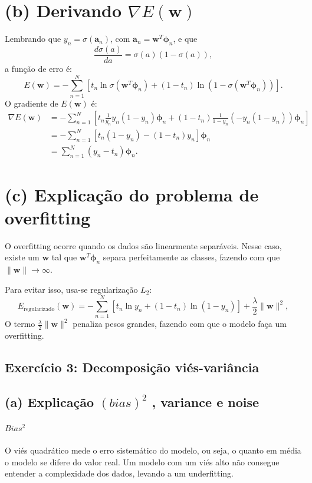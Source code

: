 \documentclass[conference]{IEEEtran}
\begin{document}
\section*{(b) Derivando $\nabla E(\mathbf{w})$}
Lembrando que $y_n = \sigma(\mathbf{a}_n)$, com $\mathbf{a}_n = \mathbf{w}^T \boldsymbol{\phi}_n$, e que
\[
\frac{d\sigma(a)}{da} = \sigma(a)(1 - \sigma(a)),
\]
a função de erro é:
\[
E(\mathbf{w}) = -\sum_{n=1}^{N} \left[ t_n \ln \sigma(\mathbf{w}^T \boldsymbol{\phi}_n) + (1 - t_n) \ln(1 - \sigma(\mathbf{w}^T \boldsymbol{\phi}_n)) \right].
\]
O gradiente de $E(\mathbf{w})$ é:
\begin{align*}
\nabla E(\mathbf{w}) &= -\sum_{n=1}^{N} \left[ t_n \frac{1}{y_n} y_n (1 - y_n) \boldsymbol{\phi}_n + (1 - t_n) \frac{1}{1 - y_n} (-y_n (1 - y_n)) \boldsymbol{\phi}_n \right] \\
&= -\sum_{n=1}^{N} \left[ t_n (1 - y_n) - (1 - t_n) y_n \right] \boldsymbol{\phi}_n \\
&= \sum_{n=1}^{N} (y_n - t_n) \boldsymbol{\phi}_n.
\end{align*}

\section*{(c) Explicação do problema de overfitting}
O overfitting ocorre quando os dados são linearmente separáveis. Nesse caso, existe um $\mathbf{w}$ tal que $\mathbf{w}^T \boldsymbol{\phi}_n$ separa perfeitamente as classes, fazendo com que $\|\mathbf{w}\| \to \infty$.

Para evitar isso, usa-se regularização $L_2$:
\[
E_{\text{regularizado}}(\mathbf{w}) = -\sum_{n=1}^{N} \left[ t_n \ln y_n + (1 - t_n) \ln(1 - y_n) \right] + \frac{\lambda}{2} \|\mathbf{w}\|^2,
\]
O termo $\frac{\lambda}{2} \|\mathbf{w}\|^2$ penaliza pesos grandes, fazendo com que o modelo faça um overfitting.

\subsection{Exercício 3: Decomposição viés-variância}
\label{subsec:ex3}
\subsection*{(a) Explicação $(bias) ^ 2$ , variance e noise}
\paragraph{$Bias ^ 2$}
O viés quadrático mede o erro sistemático do modelo, ou seja, o quanto em média o modelo se difere do valor real. Um modelo com um viés alto não consegue entender a complexidade dos dados, levando a um underfitting.
\end{document}
